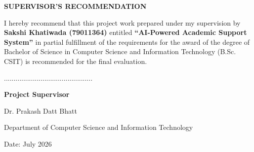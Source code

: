 \thispagestyle{plain}

\UniversityHeader

\begin{center}
    {\Large\bfseries SUPERVISOR'S RECOMMENDATION}
\end{center}

\vspace{0.25cm}

I hereby recommend that this project work prepared under my supervision by \textbf{Sakshi Khatiwada (79011364)} entitled \textbf{``AI-Powered Academic Support System''} in partial fulfillment of the requirements for the award of the degree of Bachelor of Science in Computer Science and Information Technology (B.Sc. CSIT) is recommended for the final evaluation.

\vspace{1cm}

\noindent
..............................................

\textbf{Project Supervisor}

Dr. Prakash Datt Bhatt

Department of Computer Science and Information Technology

\vfill

\noindent
Date: July 2026